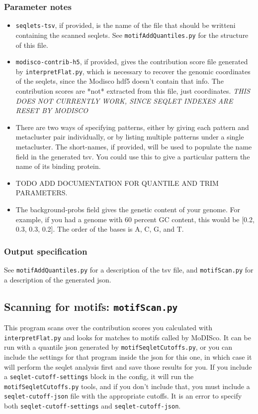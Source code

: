 \documentclass{article}
\begin{document}
\subsubsection{Parameter notes}
\begin{itemize}
    \item \texttt{seqlets-tsv}, if provided, is the name of the file that should be writteni
        containing the scanned seqlets.
        See \texttt{motifAddQuantiles.py} for the structure of this file.
    \item \texttt{modisco-contrib-h5}, if provided, gives the contribution score file
        generated by \texttt{interpretFlat.py}, which is necessary to recover the genomic
        coordinates of the seqlets, since the Modisco hdf5 doesn't contain that info.
        The contribution scores are *not* extracted from this file, just coordinates.
        \emph{THIS DOES NOT CURRENTLY WORK, SINCE SEQLET INDEXES ARE RESET BY MODISCO}
    \item There are two ways of specifying patterns, either by giving each pattern and
        metacluster pair individually, or by listing multiple patterns under a single
        metacluster.
        The short-names, if provided, will be used to populate the name field in the
        generated tsv.
        You could use this to give a particular pattern the name of its binding protein.
    \item TODO ADD DOCUMENTATION FOR QUANTILE AND TRIM PARAMETERS.
    \item The background-probs field gives the genetic content of your genome. For example, if
        you had a genome with 60 percent GC content, this would be [0.2, 0.3, 0.3, 0.2].
        The order of the bases is A, C, G, and T.
\end{itemize}

\subsubsection{Output specification}
See \texttt{motifAddQuantiles.py} for a description of the tsv file,
and \texttt{motifScan.py} for a description of the generated json.


\subsection{Scanning for motifs: \texttt{motifScan.py}}

This program scans over the contribution scores you calculated with \texttt{interpretFlat.py}
and looks for matches to motifs called by MoDISco.
It can be run with a quantile json generated by \texttt{motifSeqletCutoffs.py}, or you can
include the settings for that program inside the json for this one, in which case it
will perform the seqlet analysis first and save those results for you.
If you include a \texttt{seqlet-cutoff-settings} block in the config, it will run
the \texttt{motifSeqletCutoffs.py} tools, and if you don't include that, you must include
a \texttt{seqlet-cutoff-json} file with the appropriate cutoffs.
It is an error to specify both \texttt{seqlet-cutoff-settings} and \texttt{seqlet-cutoff-json}.
\end{document}
